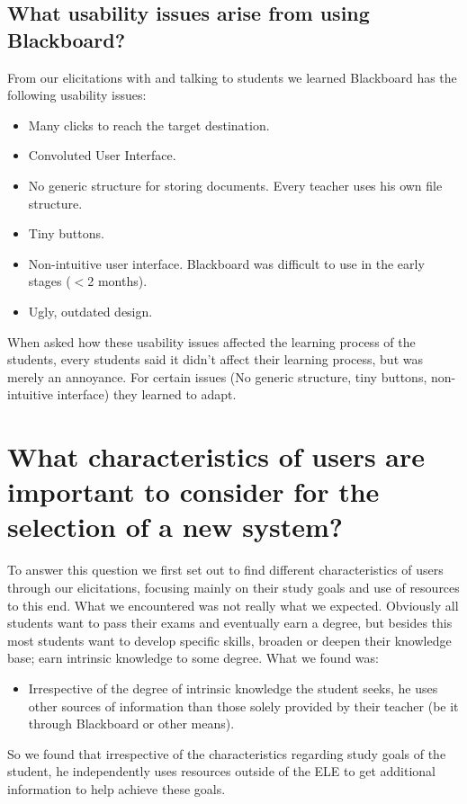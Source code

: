 \subsection{What usability issues arise from using Blackboard?}
From our elicitations with and talking to students we learned Blackboard has the following usability issues:
\begin{itemize}
	\item Many clicks to reach the target destination.
	\item Convoluted User Interface.
	\item No generic structure for storing documents. Every teacher uses his own file structure.
	\item Tiny buttons.
	\item Non-intuitive user interface. Blackboard was difficult to use in the early stages ($<$2 months).
	\item Ugly, outdated design.
\end{itemize}
When asked how these usability issues affected the learning process of the students, every students said it didn't affect their learning process, but was merely an annoyance. For certain issues (No generic structure, tiny buttons, non-intuitive interface) they learned to adapt.

\section{What characteristics of users are important to consider for the selection of a new system?}
To answer this question we first set out to find different characteristics of users through our elicitations, focusing mainly on their study goals and use of resources to this end. What we encountered was not really what we expected. Obviously all students want to pass their exams and eventually earn a degree, but besides this most students want to develop specific skills, broaden or deepen their knowledge base; earn intrinsic knowledge to some degree. What we found was:
\begin{itemize}
	\item Irrespective of the degree of intrinsic knowledge the student seeks, he uses other sources of information than those solely provided by their teacher (be it through Blackboard or other means).
\end{itemize}
So we found that irrespective of the characteristics regarding study goals of the student, he independently uses resources outside of the ELE to get additional information to help achieve these goals.

